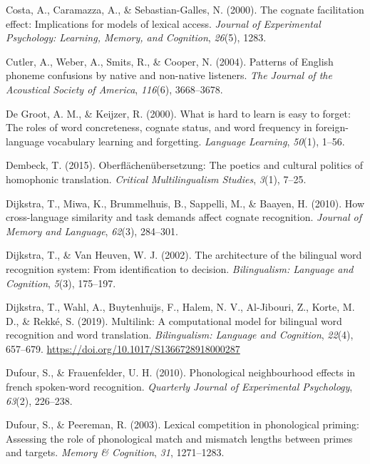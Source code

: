 \documentclass[
]{article}
\newlength{\cslhangindent}
\newenvironment{CSLReferences}[2] %
 {\begin{list}{}{%
  \setlength{\itemindent}{0pt}
  \setlength{\leftmargin}{0pt}
  \setlength{\parsep}{0pt}
  \ifodd #1
   \setlength{\leftmargin}{\cslhangindent}
   \setlength{\itemindent}{-1\cslhangindent}
  \fi
  \setlength{\itemsep}{#2\baselineskip}}}
 {\end{list}}
\begin{document}
\begin{CSLReferences}{1}{0}
Costa, A., Caramazza, A., \& Sebastian-Galles, N. (2000). The cognate
facilitation effect: Implications for models of lexical access.
\emph{Journal of Experimental Psychology: Learning, Memory, and
Cognition}, \emph{26}(5), 1283.

Cutler, A., Weber, A., Smits, R., \& Cooper, N. (2004). Patterns of
{English} phoneme confusions by native and non-native listeners.
\emph{The Journal of the Acoustical Society of America}, \emph{116}(6),
3668--3678.

De Groot, A. M., \& Keijzer, R. (2000). What is hard to learn is easy to
forget: The roles of word concreteness, cognate status, and word
frequency in foreign-language vocabulary learning and forgetting.
\emph{Language Learning}, \emph{50}(1), 1--56.

Dembeck, T. (2015). Oberfl{ä}chen{ü}bersetzung: The poetics and cultural
politics of homophonic translation. \emph{Critical Multilingualism
Studies}, \emph{3}(1), 7--25.

Dijkstra, T., Miwa, K., Brummelhuis, B., Sappelli, M., \& Baayen, H.
(2010). How cross-language similarity and task demands affect cognate
recognition. \emph{Journal of Memory and Language}, \emph{62}(3),
284--301.

Dijkstra, T., \& Van Heuven, W. J. (2002). The architecture of the
bilingual word recognition system: {From} identification to decision.
\emph{Bilingualism: Language and Cognition}, \emph{5}(3), 175--197.

Dijkstra, T., Wahl, A., Buytenhuijs, F., Halem, N. V., Al-Jibouri, Z.,
Korte, M. D., \& Rekké, S. (2019). Multilink: A computational model for
bilingual word recognition and word translation. \emph{Bilingualism:
Language and Cognition}, \emph{22}(4), 657--679.
\url{https://doi.org/10.1017/S1366728918000287}

Dufour, S., \& Frauenfelder, U. H. (2010). Phonological neighbourhood
effects in french spoken-word recognition. \emph{Quarterly Journal of
Experimental Psychology}, \emph{63}(2), 226--238.

Dufour, S., \& Peereman, R. (2003). Lexical competition in phonological
priming: {Assessing} the role of phonological match and mismatch lengths
between primes and targets. \emph{Memory \& Cognition}, \emph{31},
1271--1283.


\end{CSLReferences}
\end{document}
